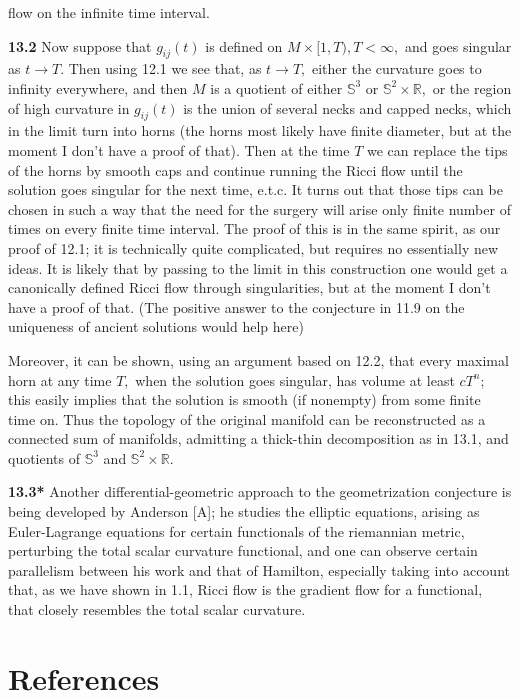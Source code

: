 \documentclass[12pt]{article}
\theoremstyle{plain}
{\swapnumbers
\newtheorem{thm}{Theorem}[section]
\newtheorem{cor}[thm]{Corollary}
\newtheorem{lem}[thm]{Lemma}
\newtheorem{prop}[thm]{Proposition}
}
\theoremstyle{definition}
{\swapnumbers
\newtheorem{defn}[thm]{Definition}
\newtheorem{nota}[thm]{Notation}
\newtheorem{parag}[thm]{}
\newtheorem*{parstr}{\addtocounter{thm}{1}\thesection.\arabic{thm}*}
\newtheorem*{intropar}{\addtocounter{thm}{1}\arabic{thm}}
}
\theoremstyle{remark} {\swapnumbers
\newtheorem{rem}[thm]{Remark}
\newtheorem{exam}[thm]{Example}
\newtheorem{lemma}[thm]{Lemma}
\newtheorem{claim}[thm]{Claim}
}
\numberwithin{equation}{section}
\begin{document}
            flow on the infinite time interval.
            \par {\bf 13.2} Now suppose that $g_{ij}(t)$ is defined on
            $M\times [1,T), T<\infty ,$ and goes singular as $t\to
            T.$ Then using 12.1 we see that, as $t\to T,$ either
            the curvature goes to infinity everywhere, and then
            $M$ is a  quotient of either $\mathbb{S}^3$ or
            $\mathbb{S}^2\times \mathbb{R},$ or the region of
            high curvature in $g_{ij}(t)$ is the union of several
            necks and capped necks, which in the limit turn into
            horns (the horns most likely have finite diameter, but
            at the moment I don't have a proof of that). Then at
            the time $T$ we can replace the tips of the horns by
            smooth caps and continue running the Ricci flow until
            the solution goes singular for the next time, e.t.c.
            It turns out that those tips can be chosen in such a
            way that the need for the surgery will arise only
            finite number of times on every finite time interval.
            The proof of this is in the same spirit,
            as our proof of 12.1; it is technically quite complicated,
            but requires no essentially new ideas. It is likely
            that by passing to the limit in this construction one
            would get a canonically defined Ricci flow through
            singularities, but at the moment I don't have a proof
            of that. (The positive answer to the conjecture in 11.9 on the
            uniqueness of ancient solutions would help here) \par
            Moreover, it can be shown, using an argument based on
            12.2, that every maximal horn at any time $T,$ when the
            solution goes singular, has volume at least $cT^n;$
            this easily implies that the solution is smooth (if nonempty) from
            some finite time on. Thus the topology of the original
            manifold can be reconstructed as a connected sum of
            manifolds, admitting a thick-thin decomposition as in
            13.1, and  quotients of $\mathbb{S}^3$ and
            $\mathbb{S}^2\times\mathbb{R}.$ \par
            {\bf 13.3*} Another  differential-geometric approach to the geometrization conjecture
            is being developed by Anderson [A]; he studies the elliptic
            equations, arising as Euler-Lagrange equations for certain functionals of the
            riemannian metric, perturbing the total scalar curvature
            functional, and one can observe certain parallelism between his work and
            that of Hamilton, especially taking into account that, as we have shown in 1.1,
            Ricci flow is the gradient flow for a functional, that closely resembles
            the total scalar curvature.   \section*{References}
\end{document}
